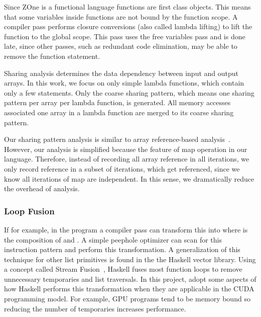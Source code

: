
Since ZOne is a functional language functions are
	first class objects.
This means that some variables inside functions are not
	bound by the function scope.
A compiler pass performs closure conversions (also called
	lambda lifting) to lift the function to the global scope.
This pass uses the free variables pass and is done late,
	since other passes, such as
	redundant code elimination, may be able to remove the
	function statement.



Sharing analysis determines the data dependency between input and output arrays.
In this work, we focus on only simple lambda functions, which contain only a few statements.
Only the coarse sharing pattern, which means one sharing pattern per array per lambda function, is generated.
All memory accesses associated one array in a lambda function are merged to its coarse sharing pattern.

Our sharing pattern analysis is similar to array reference-based analysis~\cite{alg_reference}.
However, our analysis is simplified because the feature of map operation in our language.
Therefore, instead of recording all array reference in all iterations, we only record reference in a subset of iterations, which get referenced, 
since we know all iterations of map are independent. 
In this sense, we dramatically reduce the overhead of analysis.


\subsubsection{Loop Fusion}\label{loop-fusion}

If for example, in the program
 a compiler pass can transform this
into  where  is the composition of
 and . A simple peephole optimizer can scan for this
instruction pattern and perform this transformation. A generalization of
this technique for other list primitives is found in the the Haskell
vector library. Using a concept called Stream Fusion~\cite{StreamFusion}, Haskell
fuses most function loops to remove unnecessary temporaries and list
traversals. In this project, adopt some aspects of how Haskell
performs this transformation when they are applicable in the CUDA
programming model. For example, GPU programs tend to be memory bound so
reducing the number of temporaries increases performance.

